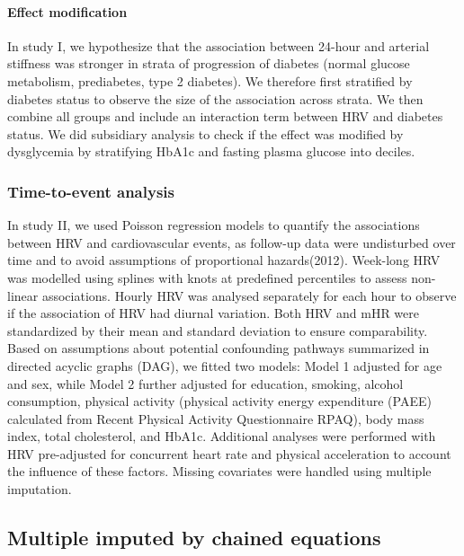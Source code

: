 \documentclass[
  a4paper,
  headsepline=true,
  open=any]{scrbook}
\let\oldparagraph\paragraph
\renewcommand{\paragraph}[1]{\oldparagraph{#1}\mbox{}}
\begin{document}
\hypertarget{effect-modification}{%
\paragraph{Effect modification}\label{effect-modification}}

In study I, we hypothesize that the association between 24-hour and
arterial stiffness was stronger in strata of progression of diabetes
(normal glucose metabolism, prediabetes, type 2 diabetes). We therefore
first stratified by diabetes status to observe the size of the
association across strata. We then combine all groups and include an
interaction term between HRV and diabetes status. We did subsidiary
analysis to check if the effect was modified by dysglycemia by
stratifying HbA1c and fasting plasma glucose into deciles.

\hypertarget{time-to-event-analysis}{%
\subsubsection{Time-to-event analysis}\label{time-to-event-analysis}}

In study II, we used Poisson regression models to quantify the
associations between HRV and cardiovascular events, as follow-up data
were undisturbed over time and to avoid assumptions of proportional
hazards(2012). Week-long HRV was modelled using splines with knots at
predefined percentiles to assess non-linear associations. Hourly HRV was
analysed separately for each hour to observe if the association of HRV
had diurnal variation. Both HRV and mHR were standardized by their mean
and standard deviation to ensure comparability. Based on assumptions
about potential confounding pathways summarized in directed acyclic
graphs (DAG), we fitted two models: Model 1 adjusted for age and sex,
while Model 2 further adjusted for education, smoking, alcohol
consumption, physical activity (physical activity energy expenditure
(PAEE) calculated from Recent Physical Activity Questionnaire RPAQ),
body mass index, total cholesterol, and HbA1c. Additional analyses were
performed with HRV pre-adjusted for concurrent heart rate and physical
acceleration to account the influence of these factors. Missing
covariates were handled using multiple imputation.

\hypertarget{multiple-imputed-by-chained-equations}{%
\subsection{Multiple imputed by chained
equations}\label{multiple-imputed-by-chained-equations}}
\end{document}
